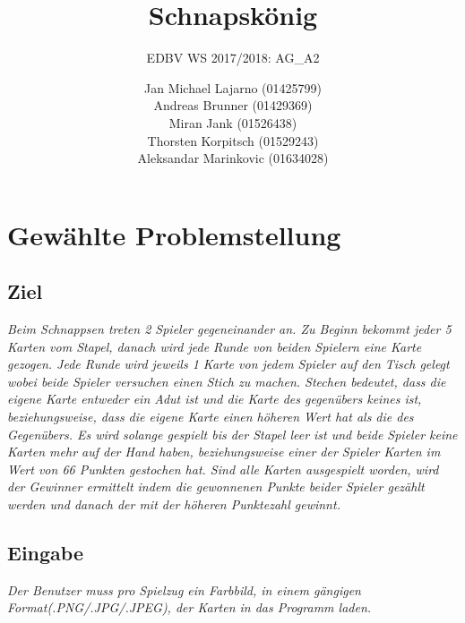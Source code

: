 \documentclass[paper=A4, deutsch]{scrartcl}
\begin{document}

\title{Schnapskönig} %

\subtitle{EDBV WS 2017/2018: AG\_A2} %


\author{Jan Michael Lajarno (01425799)\\
Andreas Brunner (01429369)\\
Miran Jank (01526438)\\
Thorsten Korpitsch (01529243)\\
Aleksandar Marinkovic (01634028)\\
}



\maketitle


\section{Gewählte Problemstellung}
\subsection{Ziel}
\textit{Beim Schnappsen treten 2 Spieler gegeneinander an. Zu Beginn bekommt jeder 5 Karten vom Stapel, danach wird jede Runde von beiden Spielern eine Karte gezogen. Jede Runde wird jeweils 1 Karte von jedem Spieler auf den Tisch gelegt wobei beide Spieler versuchen einen Stich zu machen.
Stechen bedeutet, dass die eigene Karte entweder ein Adut ist und die Karte des gegenübers keines ist, beziehungsweise, dass die eigene Karte einen höheren Wert hat als die des Gegenübers. Es wird solange gespielt bis der Stapel leer ist und beide Spieler keine Karten mehr auf der Hand haben, beziehungsweise
einer der Spieler Karten im Wert von 66 Punkten gestochen hat. Sind alle Karten ausgespielt worden, wird der Gewinner ermittelt indem die gewonnenen Punkte beider Spieler gezählt werden und danach der mit der höheren Punktezahl gewinnt.}
\subsection{Eingabe}
\textit{Der Benutzer muss pro Spielzug ein Farbbild, in einem gängigen Format(.PNG/.JPG/.JPEG), der Karten in das Programm laden.}
\end{document}
